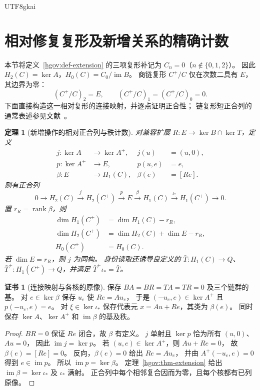 \documentclass[12pt,a4paper,openany,notitlepage]{report}
\theoremstyle{plain}
\newtheorem{theorem}{定理}[chapter]
\theoremstyle{definition}
\newtheorem*{certificate}{证书}
\theoremstyle{remark}
\begin{document}
\begin{CJK*}{UTF8}{gkai}
\section{相对修复复形及新增关系的精确计数}
\label{exp:hom:relative-extension}

本节将定义~\ref{hgov:def-extension} 的三项复形补记为
$C_n=0$（$n\notin\{0,1,2\}$）。
因此 $H_2(C)=\ker A$，$H_0(C)=C_0/\operatorname{im}B$。
商链复形 $C^+/C$ 仅在次数二具有 $E$，其边界为零：
\[
 (C^+/C)_2=E,\qquad
 (C^+/C)_1=(C^+/C)_0=0.
\]
下面直接构造这一相对复形的连接映射，并逐点证明正合性；
链复形短正合列的通常表述参见文献~\cite{ExtWeibel,ExtStacks}。

\begin{theorem}[新增操作的相对正合列与秩计数]
\label{exp:hom:relative-exact}
对兼容扩展 $R:E\to\ker B\cap\ker T$，定义
\[
 \begin{aligned}
 j:\ker A&\longrightarrow\ker A^+,&j(u)&=(u,0),\\
 p:\ker A^+&\longrightarrow E,&p(u,e)&=e,\\
 \beta:E&\longrightarrow H_1(C),&\beta(e)&=[Re].
 \end{aligned}
\]
则有正合列
\[
 0\longrightarrow H_2(C)
 \xrightarrow{j}H_2(C^+)
 \xrightarrow{p}E
 \xrightarrow{\beta}H_1(C)
 \xrightarrow{\iota_*}H_1(C^+)
 \longrightarrow0.
\]
置 $r_R=\operatorname{rank}\beta$，则
\[
 \begin{aligned}
 \dim H_1(C^+)&=\dim H_1(C)-r_R,\\
 \dim H_2(C^+)&=\dim H_2(C)+\dim E-r_R,\\
 H_0(C^+)&=H_0(C).
 \end{aligned}
\]
若 $\dim E=r_R$，则 $j$ 为同构。
身份读取还诱导良定义的 $\bar T:H_1(C)\to Q$、
$\bar T^+:H_1(C^+)\to Q$，并满足
$\bar T^+\iota_*=\bar T$。
\end{theorem}
\begin{certificate}[连接映射与各核的原像]
保存 $BA=BR=TA=TR=0$ 及三个链群的基。
对 $e\in\ker\beta$ 保存 $u_e$ 使 $Re=Au_e$，
于是 $(-u_e,e)\in\ker A^+$ 且 $p(-u_e,e)=e$。
对 $\xi\in\ker\iota_*$ 保存代表元
$x=Au+Re$，其类为 $\beta(e)$。
同时保存 $\ker A$、$\ker A^+$ 和 $\operatorname{im}\beta$ 的基及秩。
\end{certificate}
\begin{proof}
$BR=0$ 保证 $Re$ 闭合，故 $\beta$ 有定义。
$j$ 单射且 $\ker p$ 恰为所有 $(u,0)$、$Au=0$，
因此 $\operatorname{im}j=\ker p$。
若 $(u,e)\in\ker A^+$，则 $Au+Re=0$，
故 $\beta(e)=[Re]=0$。
反向，$\beta(e)=0$ 给出 $Re=Au_e$，
并由 $A^+(-u_e,e)=0$ 得到 $e\in\operatorname{im}p$。
所以 $\operatorname{im}p=\ker\beta$。
定理~\ref{hgov:thm-extension} 给出
$\operatorname{im}\beta=\ker\iota_*$ 及 $\iota_*$ 满射。
正合列中每个相邻复合因而为零，且每个核都有已列原像。


\end{proof}
\end{CJK*}
\end{document}
